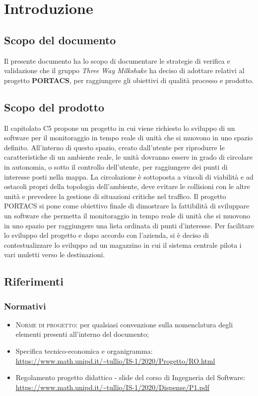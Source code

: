 \section{Introduzione}
\subsection{Scopo del documento}
Il presente documento ha lo scopo di documentare le strategie di verifica e validazione che il gruppo \textit{Three Way Milkshake} ha deciso di adottare relativi al progetto \textbf{PORTACS}, per raggiungere gli obiettivi di qualità processo e prodotto.

\subsection{Scopo del prodotto}
Il capitolato C5 propone un progetto in cui viene richiesto lo sviluppo di un software per il monitoraggio in tempo reale di unità che si muovono in uno spazio definito. All’interno di questo spazio, creato dall’utente per riprodurre le caratteristiche di un ambiente reale, le unità dovranno essere in grado di circolare in autonomia, o sotto il controllo dell’utente, per raggiungere dei punti di interesse posti nella mappa.  La circolazione è sottoposta a vincoli di viabilità e ad ostacoli propri della topologia dell’ambiente, deve evitare le collisioni con le altre unità e prevedere la gestione di situazioni critiche nel traffico.
\newline\newline
Il progetto PORTACS si pone come obiettivo finale di dimostrare la fattibilità di sviluppare un software che permetta il monitoraggio in tempo reale di unità che si muovono in uno spazio per raggiungere una lista ordinata di punti d’interesse. Per facilitare lo sviluppo del progetto e dopo accordo con l'azienda, si è deciso di contestualizzare lo sviluppo ad un magazzino in cui il sistema centrale pilota i vari muletti verso le destinazioni.

\subsection{Riferimenti}
\subsubsection{Normativi}
\begin{itemize}
	\item \textsc{Norme di progetto}: per qualsiasi convenzione sulla nomenclatura degli elementi presenti all’interno del documento;
	\item Specifica tecnico-economica e organigramma: \newline  \uline{\url{https://www.math.unipd.it/~tullio/IS-1/2020/Progetto/RO.html}} 
	\item Regolamento progetto didattico - slide del corso di Ingegneria del Software: \newline \uline{\url{https://www.math.unipd.it/~tullio/IS-1/2020/Dispense/P1.pdf}}
\end{itemize}

